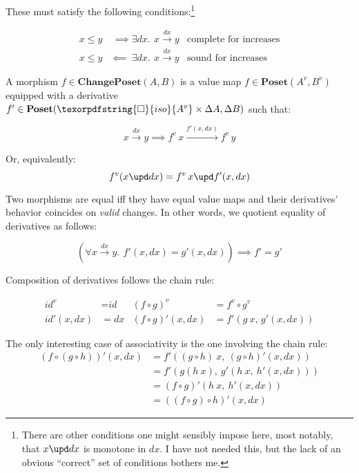 \documentclass{rntz}
\newcommand\cat\textbf
\newcommand\CP{\cat{ChangePoset}}
\newcommand\Poset{\cat{Poset}}
\newcommand\D\Delta
\newcommand\x\times
\newcommand\iso{\texorpdfstring{\ensuremath{\square}}{iso}}
\newcommand\isof[1]{\iso {#1}}
\newcommand\fname[1]{\textit{#1}}
\newcommand\id{\fname{id}}
\newcommand\vals[1]{#1^v} %
\newcommand\chgs[1]{\D{#1}}
\newcommand\funct[1]{\vals{#1}}
\newcommand\deriv[1]{#1'}
\newcommand\bindsp{~\,}
\newcommand\fa[1]{\forall #1.\bindsp}
\newcommand\ex[1]{\exists #1.\bindsp}
\newcommand\validarrow\to
\newcommand\vld[3]{{#2 \mathrel{\overset{#1}{\validarrow}} #3}}
\newcommand\longvld[3]{{#2 \xrightarrow{#1} #3}}
\begin{document}
\noindent
These must satisfy the following conditions:\footnote{There are other conditions
  one might sensibly impose here, most notably, that $x \upd dx$ is monotone in
  $dx$. I have not needed this, but the lack of an obvious ``correct'' set of
  conditions bothers me.}

\begin{align*}
  x \le y &~\implies \ex{dx} \vld{dx} x y
  & \text{complete for increases}\\
  x \le y &\impliedby~ \ex{dx} \vld{dx} x y
  & \text{sound for increases}
\end{align*}

\noindent
A morphism $f \in \CP(A, B)$ is a value map $f \in \Poset(\vals A, \vals B)$
equipped with a derivative $\deriv f \in \Poset(\isof{\vals A} \x \chgs A, \chgs
B)$ such that:

\[ \vld{dx} x y \implies \longvld{\deriv f(x,dx)}{\funct f\,x}{\funct f\,y}\]

\noindent Or, equivalently:
\[ \funct f(x \upd dx) = \funct f\,x \upd \deriv f(x, dx) \]

\noindent
Two morphisms are equal iff they have equal value maps and their derivatives'
behavior coincides on \emph{valid} changes. In other words, we quotient equality
of derivatives as follows:

\[ (\fa{\vld{dx} x y} \deriv f(x,dx) = \deriv g(x,dx))
\implies \deriv f = \deriv g \]

\noindent
Composition of derivatives follows the chain rule:

\begin{align*}
  \funct\id &= \id & \funct{(f \circ g)} &= \funct f \circ \funct g\\
  \deriv\id(x,dx) &= dx
  & \deriv{(f \circ g)} (x,dx) &= \deriv f (g ~x,\, \deriv g(x,dx))
\end{align*}

\noindent The only interesting case of associativity is the one involving the
chain rule:
\begin{align*}
  \deriv{(f \circ (g \circ h))} (x,dx)
  &= \deriv f((g \circ h) ~x,\ \deriv{(g \circ h)}(x,dx))\\
  &= \deriv f (g(h ~x),\ \deriv g(h ~x,\ \deriv h(x,dx)))\\
  &= \deriv{(f \circ g)} (h ~x,\ \deriv h(x,dx))\\
  &= \deriv{((f \circ g) \circ h)} (x,dx)
\end{align*}
\end{document}
